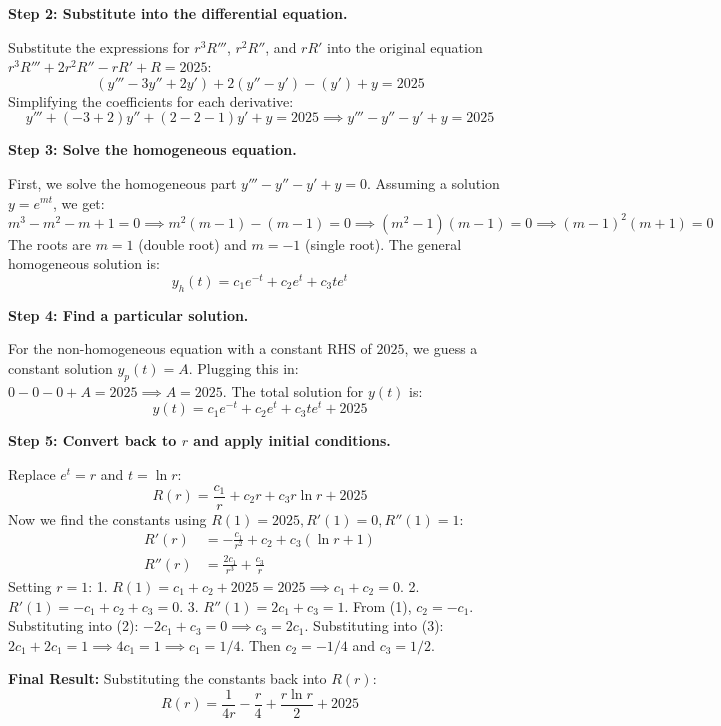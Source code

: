 \begin{solution}
\bigskip

\textbf{Step 2: Substitute into the differential equation.}
\par
Substitute the expressions for $r^3 R'''$, $r^2 R''$, and $r R'$ into the original equation $r^3 R''' + 2r^2 R'' - rR' + R = 2025$:
\[
(y''' - 3y'' + 2y') + 2(y'' - y') - (y') + y = 2025
\]
Simplifying the coefficients for each derivative:
\[
y''' + (-3 + 2)y'' + (2 - 2 - 1)y' + y = 2025 \implies y''' - y'' - y' + y = 2025
\]

\bigskip

\textbf{Step 3: Solve the homogeneous equation.}
\par
First, we solve the homogeneous part $y''' - y'' - y' + y = 0$. Assuming a solution $y = e^{mt}$, we get:
\[
m^3 - m^2 - m + 1 = 0 \implies m^2(m - 1) - (m - 1) = 0 \implies (m^2 - 1)(m - 1) = 0 \implies (m - 1)^2(m + 1) = 0
\]
The roots are $m = 1$ (double root) and $m = -1$ (single root).
The general homogeneous solution is:
\[
y_h(t) = c_1 e^{-t} + c_2 e^t + c_3 t e^t
\]

\bigskip

\textbf{Step 4: Find a particular solution.}
\par
For the non-homogeneous equation with a constant RHS of $2025$, we guess a constant solution $y_p(t) = A$.
Plugging this in: $0 - 0 - 0 + A = 2025 \implies A = 2025$.
The total solution for $y(t)$ is:
\[
y(t) = c_1 e^{-t} + c_2 e^t + c_3 t e^t + 2025
\]

\bigskip

\textbf{Step 5: Convert back to $r$ and apply initial conditions.}
\par
Replace $e^t = r$ and $t = \ln r$:
\[
R(r) = \frac{c_1}{r} + c_2 r + c_3 r \ln r + 2025
\]
Now we find the constants using $R(1) = 2025, R'(1) = 0, R''(1) = 1$:
\begin{align*}
R'(r) &= -\frac{c_1}{r^2} + c_2 + c_3(\ln r + 1) \\
R''(r) &= \frac{2c_1}{r^3} + \frac{c_3}{r}
\end{align*}
Setting $r = 1$:
1. $R(1) = c_1 + c_2 + 2025 = 2025 \implies c_1 + c_2 = 0$.
2. $R'(1) = -c_1 + c_2 + c_3 = 0$.
3. $R''(1) = 2c_1 + c_3 = 1$.
From (1), $c_2 = -c_1$. Substituting into (2): $-2c_1 + c_3 = 0 \implies c_3 = 2c_1$.
Substituting into (3): $2c_1 + 2c_1 = 1 \implies 4c_1 = 1 \implies c_1 = 1/4$.
Then $c_2 = -1/4$ and $c_3 = 1/2$.

\par\bigskip
\textbf{Final Result:}
Substituting the constants back into $R(r)$:
\[
R(r) = \frac{1}{4r} - \frac{r}{4} + \frac{r \ln r}{2} + 2025
\]
\end{solution}

